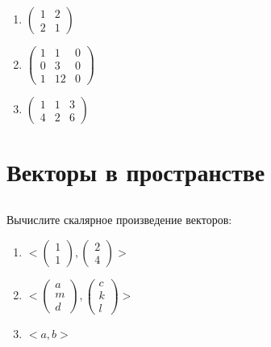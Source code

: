 \documentclass[11pt, a4paper]{extarticle}
\begin{document}
\begin{multicols}{3}
\begin{enumerate}[label=\alph*)]
		\item $\begin{pmatrix}
		1 & 2 \\
		2 & 1
		\end{pmatrix}$
		
		\item $\begin{pmatrix}
		1 & 1 & 0 \\
		0 & 3 & 0 \\
		1 & 12 & 0
		\end{pmatrix}$
		
		\item $\begin{pmatrix}
		1 & 1 & 3 \\
		4 & 2 & 6
		\end{pmatrix}$
	\end{enumerate}
\end{multicols}
	
\section{Векторы в пространстве}
	\subsection{}
	Вычислите скалярное произведение векторов:
	\begin{multicols}{3}
		\begin{enumerate}[label=\alph*)]
			
			\item $<\begin{pmatrix}
			1 \\ 1
			\end{pmatrix}, \begin{pmatrix}
			2 \\ 4
			\end{pmatrix}>$
			
			\item $<\begin{pmatrix}
			a \\ m \\ d
			\end{pmatrix}, \begin{pmatrix}
			c \\ k \\ l
			\end{pmatrix}>$
			
			\item $<a, b>$
		\end{enumerate}
	\end{multicols}
\end{document}
